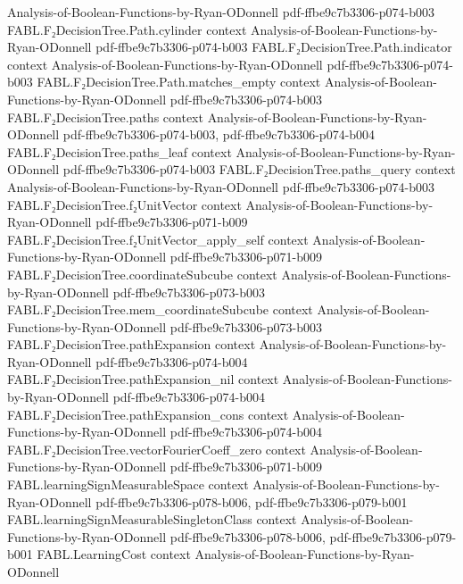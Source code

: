 \begin{theorem}
  {Analysis-of-Boolean-Functions-by-Ryan-ODonnell}
  {pdf-ffbe9c7b3306-p074-b003}
\proofstep
  {FABL.F₂DecisionTree.Path.cylinder}
  {context}
  {Analysis-of-Boolean-Functions-by-Ryan-ODonnell}
  {pdf-ffbe9c7b3306-p074-b003}
\proofstep
  {FABL.F₂DecisionTree.Path.indicator}
  {context}
  {Analysis-of-Boolean-Functions-by-Ryan-ODonnell}
  {pdf-ffbe9c7b3306-p074-b003}
\proofstep
  {FABL.F₂DecisionTree.Path.matches_empty}
  {context}
  {Analysis-of-Boolean-Functions-by-Ryan-ODonnell}
  {pdf-ffbe9c7b3306-p074-b003}
\proofstep
  {FABL.F₂DecisionTree.paths}
  {context}
  {Analysis-of-Boolean-Functions-by-Ryan-ODonnell}
  {pdf-ffbe9c7b3306-p074-b003,
    pdf-ffbe9c7b3306-p074-b004}
\proofstep
  {FABL.F₂DecisionTree.paths_leaf}
  {context}
  {Analysis-of-Boolean-Functions-by-Ryan-ODonnell}
  {pdf-ffbe9c7b3306-p074-b003}
\proofstep
  {FABL.F₂DecisionTree.paths_query}
  {context}
  {Analysis-of-Boolean-Functions-by-Ryan-ODonnell}
  {pdf-ffbe9c7b3306-p074-b003}
\proofstep
  {FABL.F₂DecisionTree.f₂UnitVector}
  {context}
  {Analysis-of-Boolean-Functions-by-Ryan-ODonnell}
  {pdf-ffbe9c7b3306-p071-b009}
\proofstep
  {FABL.F₂DecisionTree.f₂UnitVector_apply_self}
  {context}
  {Analysis-of-Boolean-Functions-by-Ryan-ODonnell}
  {pdf-ffbe9c7b3306-p071-b009}
\proofstep
  {FABL.F₂DecisionTree.coordinateSubcube}
  {context}
  {Analysis-of-Boolean-Functions-by-Ryan-ODonnell}
  {pdf-ffbe9c7b3306-p073-b003}
\proofstep
  {FABL.F₂DecisionTree.mem_coordinateSubcube}
  {context}
  {Analysis-of-Boolean-Functions-by-Ryan-ODonnell}
  {pdf-ffbe9c7b3306-p073-b003}
\proofstep
  {FABL.F₂DecisionTree.pathExpansion}
  {context}
  {Analysis-of-Boolean-Functions-by-Ryan-ODonnell}
  {pdf-ffbe9c7b3306-p074-b004}
\proofstep
  {FABL.F₂DecisionTree.pathExpansion_nil}
  {context}
  {Analysis-of-Boolean-Functions-by-Ryan-ODonnell}
  {pdf-ffbe9c7b3306-p074-b004}
\proofstep
  {FABL.F₂DecisionTree.pathExpansion_cons}
  {context}
  {Analysis-of-Boolean-Functions-by-Ryan-ODonnell}
  {pdf-ffbe9c7b3306-p074-b004}
\proofstep
  {FABL.F₂DecisionTree.vectorFourierCoeff_zero}
  {context}
  {Analysis-of-Boolean-Functions-by-Ryan-ODonnell}
  {pdf-ffbe9c7b3306-p071-b009}
\proofstep
  {FABL.learningSignMeasurableSpace}
  {context}
  {Analysis-of-Boolean-Functions-by-Ryan-ODonnell}
  {pdf-ffbe9c7b3306-p078-b006,
    pdf-ffbe9c7b3306-p079-b001}
\proofstep
  {FABL.learningSignMeasurableSingletonClass}
  {context}
  {Analysis-of-Boolean-Functions-by-Ryan-ODonnell}
  {pdf-ffbe9c7b3306-p078-b006,
    pdf-ffbe9c7b3306-p079-b001}
\proofstep
  {FABL.LearningCost}
  {context}
  {Analysis-of-Boolean-Functions-by-Ryan-ODonnell}

\end{theorem}

